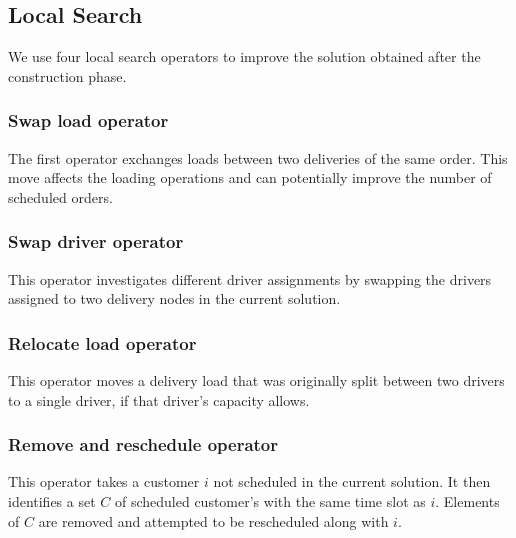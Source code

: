 \documentclass{article}
\begin{document}
\subsection{ Local Search}

We use four local search operators to improve the solution obtained after the construction phase.

\subsubsection*{Swap load operator}

The first operator exchanges loads between two deliveries of the same order. This move affects the loading operations and can potentially improve the number of scheduled orders.

\subsubsection*{Swap driver operator}

This operator investigates different driver assignments by swapping the drivers assigned to two delivery nodes in the current solution.

\subsubsection*{Relocate load operator}

This operator moves a delivery load that was originally split between two drivers to a single driver, if that driver's capacity allows.

\subsubsection*{Remove and reschedule operator}

This operator takes a customer $i$ not scheduled in the current solution. It then identifies a set $C$ of scheduled customer's with the same time slot as $i$. Elements of $C$ are removed and attempted to be rescheduled along with $i$.


\end{document}

